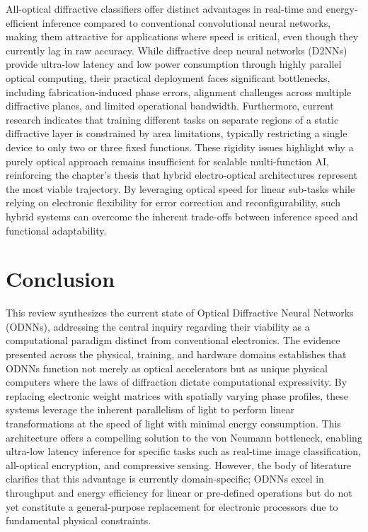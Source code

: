 All-optical diffractive classifiers offer distinct advantages in real-time and energy-efficient inference compared to conventional convolutional neural networks, making them attractive for applications where speed is critical, even though they currently lag in raw accuracy. While diffractive deep neural networks (D2NNs) provide ultra-low latency and low power consumption through highly parallel optical computing, their practical deployment faces significant bottlenecks, including fabrication-induced phase errors, alignment challenges across multiple diffractive planes, and limited operational bandwidth. Furthermore, current research indicates that training different tasks on separate regions of a static diffractive layer is constrained by area limitations, typically restricting a single device to only two or three fixed functions. These rigidity issues highlight why a purely optical approach remains insufficient for scalable multi-function AI, reinforcing the chapter's thesis that hybrid electro-optical architectures represent the most viable trajectory. By leveraging optical speed for linear sub-tasks while relying on electronic flexibility for error correction and reconfigurability, such hybrid systems can overcome the inherent trade-offs between inference speed and functional adaptability. \citep{doi_10_1364_ol_593231_ab93febc} \citep{doi_10_1364_oe_598903_731aaac1} \citep{doi_10_48550_arxiv_2411_05748_a91b6f61}

\section{Conclusion}\label{conclusion}

This review synthesizes the current state of Optical Diffractive Neural Networks (ODNNs), addressing the central inquiry regarding their viability as a computational paradigm distinct from conventional electronics. The evidence presented across the physical, training, and hardware domains establishes that ODNNs function not merely as optical accelerators but as unique physical computers where the laws of diffraction dictate computational expressivity. By replacing electronic weight matrices with spatially varying phase profiles, these systems leverage the inherent parallelism of light to perform linear transformations at the speed of light with minimal energy consumption. This architecture offers a compelling solution to the von Neumann bottleneck, enabling ultra-low latency inference for specific tasks such as real-time image classification, all-optical encryption, and compressive sensing. However, the body of literature clarifies that this advantage is currently domain-specific; ODNNs excel in throughput and energy efficiency for linear or pre-defined operations but do not yet constitute a general-purpose replacement for electronic processors due to fundamental physical constraints.

